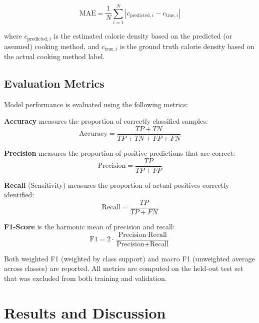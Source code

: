 \documentclass[journal]{IEEEtran}
\begin{document}
\begin{equation}
    \text{MAE} = \frac{1}{N} \sum_{i=1}^{N} |c_{\text{predicted},i} - c_{\text{true},i}|
\end{equation}

\noindent where $c_{\text{predicted},i}$ is the estimated calorie density based on the predicted (or assumed) cooking method, and $c_{\text{true},i}$ is the ground truth calorie density based on the actual cooking method label.

\subsection{Evaluation Metrics}

Model performance is evaluated using the following metrics:

\textbf{Accuracy} measures the proportion of correctly classified samples:
\begin{equation}
    \text{Accuracy} = \frac{TP + TN}{TP + TN + FP + FN}
\end{equation}

\textbf{Precision} measures the proportion of positive predictions that are correct:
\begin{equation}
    \text{Precision} = \frac{TP}{TP + FP}
\end{equation}

\textbf{Recall} (Sensitivity) measures the proportion of actual positives correctly identified:
\begin{equation}
    \text{Recall} = \frac{TP}{TP + FN}
\end{equation}

\textbf{F1-Score} is the harmonic mean of precision and recall:
\begin{equation}
    \text{F1} = 2 \cdot \frac{\text{Precision} \cdot \text{Recall}}{\text{Precision} + \text{Recall}}
\end{equation}

Both weighted F1 (weighted by class support) and macro F1 (unweighted average across classes) are reported. All metrics are computed on the held-out test set that was excluded from both training and validation.

\section{Results and Discussion}
\end{document}

